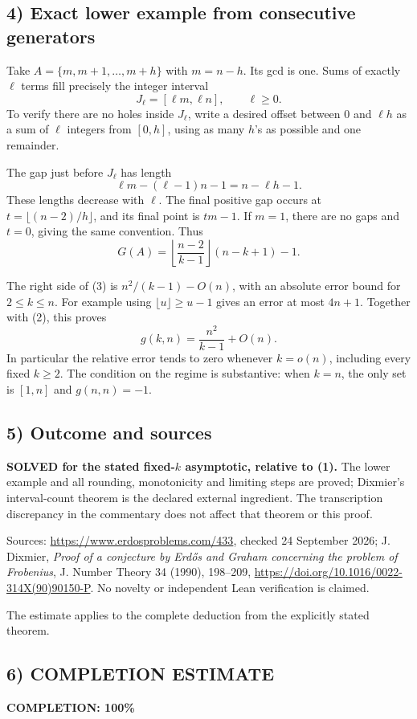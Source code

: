 \subsection*{4) Exact lower example from consecutive generators}
Take $A=\{m,m+1,\ldots,m+h\}$ with $m=n-h$. Its gcd is one. Sums of exactly $\ell$ terms fill precisely the integer interval
\[J_\ell=[\ell m,\ell n],\qquad \ell\ge0.
\]
To verify there are no holes inside $J_\ell$, write a desired offset between 0 and $\ell h$ as a sum of $\ell$ integers from $[0,h]$, using as many $h$'s as possible and one remainder.

The gap just before $J_\ell$ has length
\[\ell m-(\ell-1)n-1=n-\ell h-1.
\]
These lengths decrease with $\ell$. The final positive gap occurs at $t=\lfloor(n-2)/h\rfloor$, and its final point is $tm-1$. If $m=1$, there are no gaps and $t=0$, giving the same convention. Thus
\[G(A)=\left\lfloor\frac{n-2}{k-1}\right\rfloor(n-k+1)-1.\tag{3}\]

The right side of (3) is $n^2/(k-1)-O(n)$, with an absolute error bound for $2\le k\le n$. For example using $\lfloor u\rfloor\ge u-1$ gives an error at most $4n+1$. Together with (2), this proves
\[g(k,n)=\frac{n^2}{k-1}+O(n).
\]
In particular the relative error tends to zero whenever $k=o(n)$, including every fixed $k\ge2$. The condition on the regime is substantive: when $k=n$, the only set is $[1,n]$ and $g(n,n)=-1$.

\subsection*{5) Outcome and sources}
\textbf{SOLVED for the stated fixed-$k$ asymptotic, relative to (1).} The lower example and all rounding, monotonicity and limiting steps are proved; Dixmier's interval-count theorem is the declared external ingredient. The transcription discrepancy in the commentary does not affect that theorem or this proof.

Sources: \url{https://www.erdosproblems.com/433}, checked 24 September 2026; J. Dixmier, \emph{Proof of a conjecture by Erd\H{o}s and Graham concerning the problem of Frobenius}, J. Number Theory 34 (1990), 198--209, \url{https://doi.org/10.1016/0022-314X(90)90150-P}. No novelty or independent Lean verification is claimed.

The estimate applies to the complete deduction from the explicitly stated theorem.
\subsection*{6) COMPLETION ESTIMATE}
\textbf{COMPLETION: 100\%}
